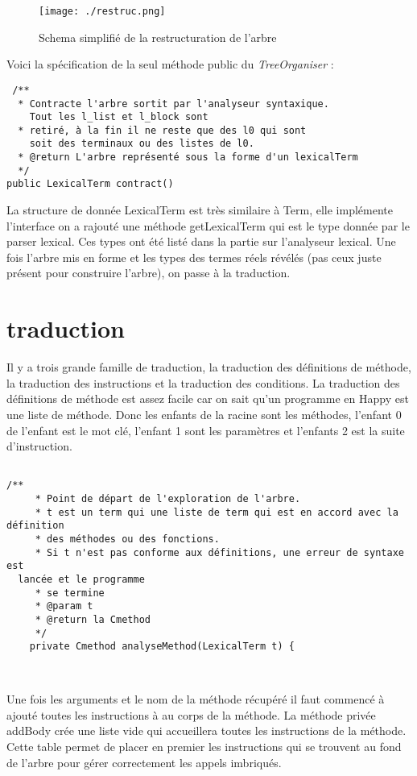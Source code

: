 \begin{figure}
 \centering
 \texttt{[image: ./restruc.png]}
 \caption{Schema simplifié de la restructuration de l'arbre}
 \label{restruc}
\end{figure}


Voici la spécification de la seul méthode public du \textit{TreeOrganiser} :
\begin{verbatim}
 /**
  * Contracte l'arbre sortit par l'analyseur syntaxique. 
    Tout les l_list et l_block sont
  * retiré, à la fin il ne reste que des l0 qui sont 
    soit des terminaux ou des listes de l0.
  * @return L'arbre représenté sous la forme d'un lexicalTerm
  */
public LexicalTerm contract()
\end{verbatim}

La structure de donnée LexicalTerm est très similaire à Term, elle implémente l'interface on a rajouté une méthode getLexicalTerm
qui est le type donnée par le parser lexical. Ces types ont été listé dans la partie sur l'analyseur lexical. Une fois 
l'arbre mis en forme et les types des termes réels révélés (pas ceux juste présent pour construire l'arbre), on passe à la traduction.

\section{traduction}
Il y a trois grande famille de traduction, la traduction des définitions de méthode, la traduction des instructions et la traduction des conditions.
La traduction des définitions de méthode est assez facile car on sait qu'un programme en Happy est une liste de méthode. Donc les enfants
de la racine sont les méthodes, l'enfant 0 de l'enfant est le mot clé, l'enfant 1 sont les paramètres et l'enfants 2 est la suite d'instruction.
\begin{verbatim}

/**
	 * Point de départ de l'exploration de l'arbre. 
	 * t est un term qui une liste de term qui est en accord avec la définition
	 * des méthodes ou des fonctions.
	 * Si t n'est pas conforme aux définitions, une erreur de syntaxe est 
  lancée et le programme
	 * se termine
	 * @param t 
	 * @return la Cmethod 
	 */
	private Cmethod analyseMethod(LexicalTerm t) { 

 
\end{verbatim}

Une fois les arguments et le nom de la méthode récupéré il faut commencé à ajouté toutes les instructions à au corps de la méthode.
La méthode privée addBody crée une liste vide qui accueillera toutes les instructions de la méthode. Cette table permet de placer en premier
les instructions qui se trouvent au fond de l'arbre pour gérer correctement les appels imbriqués.

